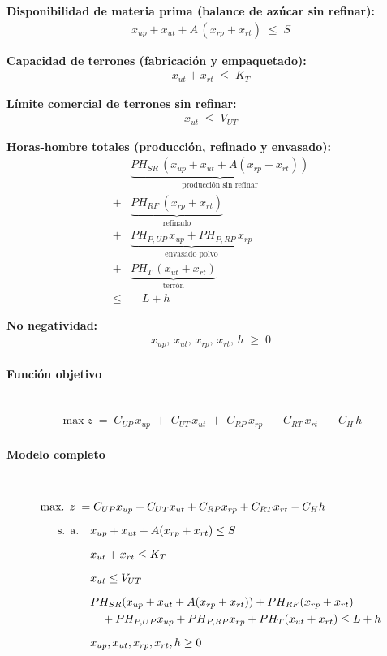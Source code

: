 \textbf{Disponibilidad de materia prima (balance de azúcar sin refinar):}
\begin{align}
x_{up} + x_{ut} + A\,(x_{rp}+x_{rt}) \;\le\; S
\end{align}

\textbf{Capacidad de terrones (fabricación y empaquetado):}
\begin{align}
x_{ut} + x_{rt} \;\le\; K_T
\end{align}

\textbf{Límite comercial de terrones sin refinar:}
\begin{align}
x_{ut} \;\le\; V_{UT}
\end{align}

\textbf{Horas-hombre totales (producción, refinado y envasado):}
\begin{align}
& \underbrace{PH_{SR}\,(x_{up}+x_{ut}+A(x_{rp}+x_{rt}))}_{\text{producción sin refinar}} \\[6pt]
+& \underbrace{PH_{RF}\,(x_{rp}+x_{rt})}_{\text{refinado}} \\[6pt]
+& \underbrace{PH_{P,UP}\,x_{up} + PH_{P,RP}\,x_{rp}}_{\text{envasado polvo}} \\[6pt]
+& \underbrace{PH_{T}\,(x_{ut}+x_{rt})}_{\text{terrón}} \\[6pt]
\le & \quad L + h
\end{align}


\textbf{No negatividad:}
\begin{align}
x_{up},\,x_{ut},\,x_{rp},\,x_{rt},\,h \;\ge\; 0
\end{align}

\paragraph{Función objetivo}\mbox{}\\

\begin{align}
\max z \;=\; C_{UP}\,x_{up} \;+\; C_{UT}\,x_{ut} \;+\; C_{RP}\,x_{rp} \;+\; C_{RT}\,x_{rt} \;-\; C_H\,h
\end{align}

\paragraph{Modelo completo}\mbox{}\\

\begin{align}
\mbox{max. } z \;=&\; C_{UP}x_{up} + C_{UT}x_{ut} + C_{RP}x_{rp} + C_{RT}x_{rt} - C_Hh \\[6pt]
\text{s. a.}\quad 
& x_{up} + x_{ut} + A(x_{rp}+x_{rt}) \le S \\[6pt]
& x_{ut} + x_{rt} \le K_T \\[6pt]
& x_{ut} \le V_{UT} \\[6pt]
& PH_{SR}(x_{up}+x_{ut}+A(x_{rp}+x_{rt})) + PH_{RF}(x_{rp}+x_{rt}) \notag \\
& \quad + PH_{P,UP}x_{up} + PH_{P,RP}x_{rp} + PH_T(x_{ut}+x_{rt}) \le L + h \\[6pt]
& x_{up}, x_{ut}, x_{rp}, x_{rt}, h \ge 0
\end{align}



